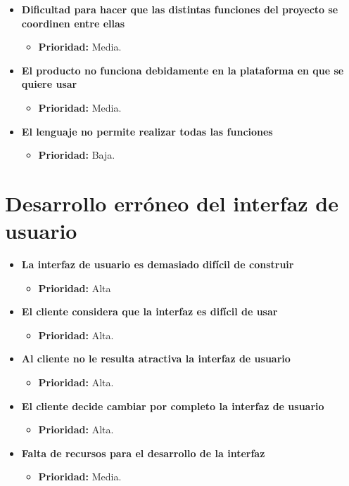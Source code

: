 \documentclass[spanish,a4paper,11pt, twoside]{report}	%
\begin{document}
\begin{itemize}
		\item \textbf{Dificultad para hacer que las distintas funciones del proyecto se coordinen entre ellas}
			\begin{itemize}
				\item \textbf{Prioridad: }Media.
			\end{itemize}
		

		\item \textbf{El producto no funciona debidamente en la plataforma en que se quiere usar}
			\begin{itemize}
				\item \textbf{Prioridad: }Media.
			\end{itemize}
		
		\item \textbf{El lenguaje no permite realizar todas las funciones}
			\begin{itemize}
				\item \textbf{Prioridad: }Baja.
			\end{itemize}

	\end{itemize}

%
\section{Desarrollo erróneo del interfaz de usuario}
	\begin{itemize}
		\item \textbf{La interfaz de usuario es demasiado difícil de construir}%
			\begin{itemize}
				\item \textbf{Prioridad: }Alta
			\end{itemize}
				
		\item \textbf{El cliente considera que la interfaz es difícil de usar}%
			\begin{itemize}
				\item \textbf{Prioridad: }Alta.
			\end{itemize}
		
		\item \textbf{Al cliente no le resulta atractiva la interfaz de usuario}%
			\begin{itemize}
				\item \textbf{Prioridad: }Alta.
			\end{itemize}
		
		\item \textbf{El cliente decide cambiar por completo la interfaz de usuario}%
			\begin{itemize}
				\item \textbf{Prioridad: }Alta.
			\end{itemize}

		\item \textbf{Falta de recursos para el desarrollo de la interfaz}
			\begin{itemize}
				\item \textbf{Prioridad: }Media.
			\end{itemize}

	\end{itemize}
%
\end{document}
